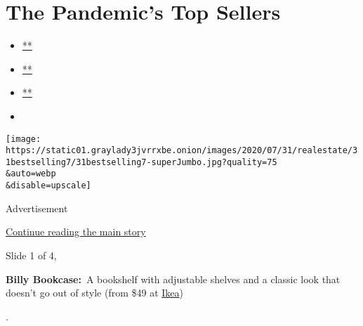 \hypertarget{the-pandemics-top-sellers}{%
\section{The Pandemic's Top Sellers}\label{the-pandemics-top-sellers}}

\begin{itemize}
\item
  \href{https://www.facebookcorewwwi.onion/sharer.php?app_id=9869919170\&u=https\%3A\%2F\%2Fwww.nytimes3xbfgragh.onion\%2Fslideshow\%2F2020\%2F07\%2F31\%2Frealestate\%2Fthe-pandemics-top-sellers.html\%3Fsmid\%3Dfb-share\&name=The\%20Pandemic\%E2\%80\%99s\%20Top\%20Sellers\&redirect_uri=https\%3A\%2F\%2Fwww.facebookcorewwwi.onion\%2F}{**}
\item
  \href{https://twitter.com/intent/tweet?url=https\%3A\%2F\%2Fwww.nytimes3xbfgragh.onion\%2Fslideshow\%2F2020\%2F07\%2F31\%2Frealestate\%2Fthe-pandemics-top-sellers.html\%3Fsmid\%3Dtw-share\&text=The\%20Pandemic\%E2\%80\%99s\%20Top\%20Sellers}{**}
\item
  \href{mailto:?subject=nytimes3xbfgragh.onion\%3A\%20The\%20Pandemic\%E2\%80\%99s\%20Top\%20Sellers\&body=From\%20The\%20New\%20York\%20Times\%3A\%0A\%0AThe\%20Pandemic\%E2\%80\%99s\%20Top\%20Sellers\%0A\%0AAs\%20we\%20shelter\%20in\%20place\%2C\%20the\%20things\%20we\%E2\%80\%99ve\%20been\%20buying\%20for\%20our\%20homes\%20have\%20shifted\%20a\%20bit.\%0A\%0Ahttps\%3A\%2F\%2Fwww.nytimes3xbfgragh.onion\%2Fslideshow\%2F2020\%2F07\%2F31\%2Frealestate\%2Fthe-pandemics-top-sellers.html\%3Fsmid\%3Dem-share}{**}
\item
\end{itemize}

\texttt{[image: https://static01.graylady3jvrrxbe.onion/images/2020/07/31/realestate/31bestselling7/31bestselling7-superJumbo.jpg?quality=75\\\&auto=webp\\\&disable=upscale]}

Advertisement

\protect\hyperlink{after-right-0}{Continue reading the main story}

Slide 1 of 4,

\textbf{Billy Bookcase:}~A bookshelf with adjustable shelves and a
classic look that doesn't go out of style (from \$49 at
\href{https://www.ikea.com/us/en/p/billy-bookcase-white-00263850/}{Ikea})~~

.

